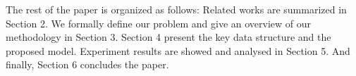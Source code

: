 The rest of the paper is organized as follows: Related works are summarized in Section 2. We formally define our problem and give an overview of our methodology in Section 3. Section 4 present the key data structure and the proposed model. Experiment results are showed and analysed in Section 5. And finally, Section 6 concludes the paper.
